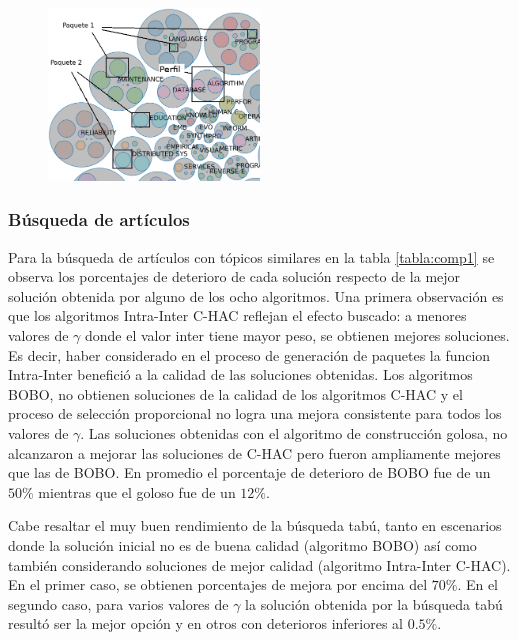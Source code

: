 \begin{figure}[H]
  \centering
    \includegraphics[width=0.5\textwidth]{img/explain-bubbles.png}
  \caption{}
  \label{res:img-explain-bubbles}
\end{figure}

\subsubsection{Búsqueda de artículos}
Para la búsqueda de artículos con tópicos similares en la tabla \ref{tabla:comp1} se observa los porcentajes de deterioro de cada solución respecto de la mejor solución obtenida por alguno de los ocho algoritmos. Una primera observación es que los algoritmos  Intra-Inter C-HAC reflejan el efecto buscado: a menores valores de $\gamma$ donde el valor inter tiene mayor peso, se obtienen mejores soluciones. Es decir, haber considerado en el proceso de generación de paquetes la funcion Intra-Inter benefició a la calidad de las soluciones obtenidas. Los algoritmos BOBO, no obtienen soluciones de la calidad de los algoritmos C-HAC y el proceso de selección proporcional no logra una mejora consistente para todos los valores de $\gamma$. Las soluciones obtenidas con el algoritmo de construcción golosa, no alcanzaron a mejorar las soluciones de C-HAC pero fueron ampliamente mejores que las de BOBO. En promedio el porcentaje de deterioro de BOBO fue de un $50\%$ mientras que el goloso fue de un $12\%$. 

Cabe resaltar el muy buen rendimiento de la búsqueda tabú, tanto en escenarios donde la solución inicial no es de buena calidad (algoritmo BOBO) así como también considerando soluciones de mejor calidad (algoritmo Intra-Inter C-HAC). En el primer caso, se obtienen porcentajes de mejora por encima del $70\%$. En el segundo caso, para varios valores de $\gamma$ la solución obtenida por la búsqueda tabú resultó ser la mejor opción y en otros con deterioros inferiores al $0.5\%$.

